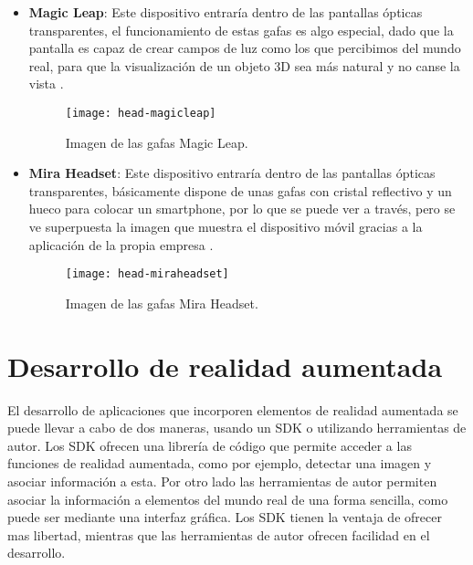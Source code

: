 \begin{itemize}
  \item \textbf{Magic Leap}: Este dispositivo entraría dentro de las pantallas ópticas transparentes, el funcionamiento de estas gafas es algo especial, dado que la pantalla es capaz de crear campos de luz como los que percibimos del mundo real, para que la visualización de un objeto 3D sea más natural y no canse la vista \cite{magic-leap}.

  \begin{figure}[h]
    \centering
    \texttt{[image: head-magicleap]}
    \caption{Imagen de las gafas Magic Leap.\protect\footnotemark}
    \label{figura-magicleap}
  \end{figure}


  \item \textbf{Mira Headset}: Este dispositivo entraría dentro de las pantallas ópticas transparentes, básicamente dispone de unas gafas con cristal reflectivo y un hueco para colocar un smartphone, por lo que se puede ver a través, pero se ve superpuesta la imagen que muestra el dispositivo móvil gracias a la aplicación de la propia empresa \cite{mira-ar}.

  \begin{figure}[h]
    \centering
    \texttt{[image: head-miraheadset]}
    \caption{Imagen de las gafas Mira Headset.\protect\footnotemark}
    \label{figura-miraheadset}
  \end{figure}


\end{itemize}

\section{Desarrollo de realidad aumentada}
El desarrollo de aplicaciones que incorporen elementos de realidad aumentada se puede llevar a cabo de dos maneras, usando un SDK o utilizando herramientas de autor. Los SDK ofrecen una librería de código que permite acceder a las funciones de realidad aumentada, como por ejemplo, detectar una imagen y asociar información a esta. Por otro lado las herramientas de autor permiten asociar la información a elementos del mundo real de una forma sencilla, como puede ser mediante una interfaz gráfica. Los SDK tienen la ventaja de ofrecer mas libertad, mientras que las herramientas de autor ofrecen facilidad en el desarrollo.

